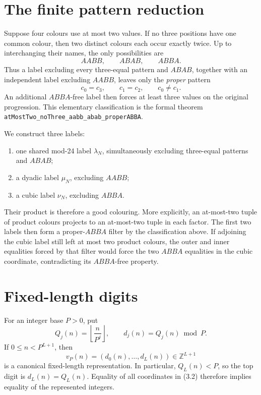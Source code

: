 \documentclass[11pt]{article}
\theoremstyle{definition}
\newcommand{\Z}{\mathbb Z}
\begin{document}
\section{The finite pattern reduction}

Suppose four colours use at most two values.  If no three positions have one
common colour, then two distinct colours each occur exactly twice.  Up to
interchanging their names, the only possibilities are
\[
 AABB,\qquad ABAB,\qquad ABBA.
 \tag{2.1}
\]
Thus a label excluding every three-equal pattern and \(ABAB\), together with
an independent label excluding \(AABB\), leaves only the \emph{proper}
pattern
\[
 c_0=c_3,\qquad c_1=c_2,\qquad c_0\ne c_1.
 \tag{2.2}
\]
An additional \(ABBA\)-free label then forces at least three values on the
original progression.  This elementary classification is the formal theorem
\nolinkurl{atMostTwo_noThree_aabb_abab_properABBA}.

We construct three labels:
\begin{enumerate}[label=(\roman*)]
\item one shared mod-24 label \(\lambda_N\), simultaneously excluding
      three-equal patterns and \(ABAB\);
\item a dyadic label \(\mu_N\), excluding \(AABB\);
\item a cubic label \(\nu_N\), excluding \(ABBA\).
\end{enumerate}
Their product is therefore a good colouring.  More explicitly, an
at-most-two tuple of product colours projects to an at-most-two tuple in each
factor.  The first two labels then form a proper-\(ABBA\) filter by the
classification above.  If adjoining the cubic label still left at most two
product colours, the outer and inner equalities forced by that filter would
force the two \(ABBA\) equalities in the cubic coordinate, contradicting its
\(ABBA\)-free property.

\section{Fixed-length digits}

For an integer base \(P>0\), put
\[
 Q_j(n)=\left\lfloor\frac{n}{P^j}\right\rfloor,
 \qquad d_j(n)=Q_j(n)\bmod P.
 \tag{3.1}
\]
If \(0\leq n<P^{L+1}\), then
\[
 v_P(n)=(d_0(n),\ldots,d_L(n))\in\Z^{L+1}
 \tag{3.2}
\]
is a canonical fixed-length representation.  In particular,
\(Q_L(n)<P\), so the top digit is \(d_L(n)=Q_L(n)\).  Equality of all
coordinates in (3.2) therefore implies equality of the represented integers.
\end{document}
